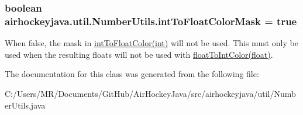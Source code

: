 \subsubsection[{int\+To\+Float\+Color\+Mask}]{\setlength{\rightskip}{0pt plus 5cm}boolean airhockeyjava.\+util.\+Number\+Utils.\+int\+To\+Float\+Color\+Mask = true\hspace{0.3cm}{\ttfamily [static]}}\label{classairhockeyjava_1_1util_1_1_number_utils_a6b33766f5a40dbc01baeea59eab7d58e}
When false, the mask in \hyperlink{classairhockeyjava_1_1util_1_1_number_utils_ae0482ec6ce04cbf04cb9fd2799c153e2}{int\+To\+Float\+Color(int)} will not be used. This must only be used when the resulting floats will not be used with \hyperlink{}{float\+To\+Int\+Color(float)}. 

The documentation for this class was generated from the following file\+:\begin{DoxyCompactItemize}
\item 
C\+:/\+Users/\+M\+R/\+Documents/\+Git\+Hub/\+Air\+Hockey\+Java/src/airhockeyjava/util/Number\+Utils.\+java\end{DoxyCompactItemize}
